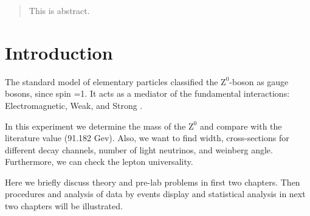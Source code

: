 \begin{abstract}
	This is abstract.
\end{abstract}
\section{Introduction}
The standard model of elementary particles classified the $ \text{Z}^0 $-boson as gauge bosons, since spin =1. It acts as a mediator of the fundamental interactions: Electromagnetic, Weak, and Strong \cite{manual}. 

In this experiment we determine the mass of the $ \text{Z}^0 $ and compare with the literature value (91.182 Gev). Also, we want to find width, cross-sections for different decay channels, number of light neutrinos, and weinberg angle. Furthermore, we can check the lepton universality.

Here we briefly discuss theory and pre-lab problems in first two chapters. Then procedures and analysis of data by events display and statistical analysis in next two chapters will be illustrated. 